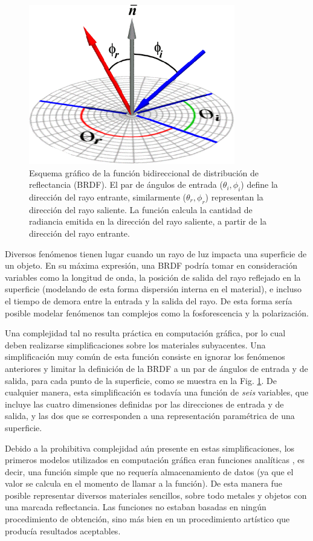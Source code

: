 \begin{figure}
\center
\includegraphics[width=9cm]{figures/brdf}
\caption[Esquema gráfico de la función bidireccional de distribución de reflectancia]{Esquema gráfico de la función bidireccional de distribución de reflectancia (BRDF). El par de ángulos de entrada ($\theta_{i},\phi_{i}$) define la dirección del rayo entrante, similarmente ($\theta_{r},\phi_{r}$) representan la dirección del rayo saliente. La función calcula la cantidad de radiancia emitida en la dirección del rayo saliente, a partir de la dirección del rayo entrante.}
\label{fg:brdf}
\end{figure}

Diversos fenómenos tienen lugar cuando un rayo de luz impacta una superficie de un objeto. En su máxima expresión, una BRDF podría tomar en consideración variables como la longitud de onda, la posición de salida del rayo reflejado en la superficie (modelando de esta forma dispersión interna en el material), e incluso el tiempo de demora entre la entrada y la salida del rayo.
De esta forma sería posible modelar fenómenos tan complejos como la fosforescencia y la polarización.

Una complejidad tal no resulta práctica en computación gráfica, por lo cual deben realizarse simplificaciones sobre los materiales subyacentes.
Una simplificación muy común de esta función consiste en ignorar los fenómenos anteriores y limitar la definición de la BRDF a un par de ángulos de entrada y de salida, para cada punto de la superficie, como se muestra en la Fig. \ref{fg:brdf}.
De cualquier manera, esta simplificación es todavía una función de {\em seis} variables, que incluye las cuatro dimensiones definidas por las direcciones de entrada y de salida, y las dos que se corresponden a una representación paramétrica de una superficie.

Debido a la prohibitiva complejidad aún presente en estas simplificaciones, los primeros modelos utilizados en computación gráfica eran funciones analíticas \cite{Phong1975,Blinn1977}, es decir, una función simple que no requería almacenamiento de datos (ya que el valor se calcula en el momento de llamar a la función).
De esta manera fue posible representar diversos materiales sencillos, sobre todo metales y objetos con una marcada reflectancia.
Las funciones no estaban basadas en ningún procedimiento de obtención, sino más bien en un procedimiento artístico que producía resultados aceptables.

